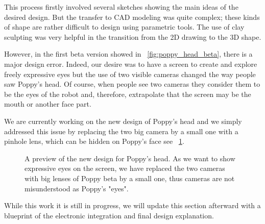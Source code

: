 This process firstly involved several sketches showing the main ideas of the desired design. But the transfer to CAD modeling was quite complex; these kinds of shape are rather difficult to design using parametric tools. The use of clay sculpting was very helpful  in the transition from the 2D drawing to the 3D shape.




However, in the first beta version showed in \figurename~\ref{fig:poppy_head_beta}, there is a major design error. Indeed, our desire was to have a screen to create and explore freely expressive eyes but the use of two visible cameras changed the way people saw Poppy's head. Of course, when people see two cameras they consider them to be the eyes of the robot and, therefore, extrapolate that the screen may be the mouth or another face part.

We are currently working on the new design of Poppy's head and we simply addressed this issue by replacing the two big camera by a small one with a pinhole lens, which can be hidden on Poppy’s face see \figurename~\ref{fig:poppy_head_v1}.

\begin{figure}[tb]
\centering
    \caption{A preview of the new design for Poppy's head. As we want to show expressive eyes on the screen, we have replaced the two cameras with big lenses of Poppy beta by a small one, thus cameras are not misunderstood as Poppy's "eyes". }
    \label{fig:poppy_head_v1}
\end{figure}


While this work it is still in progress, we will update this section afterward with a blueprint of the electronic integration and final design explanation.
